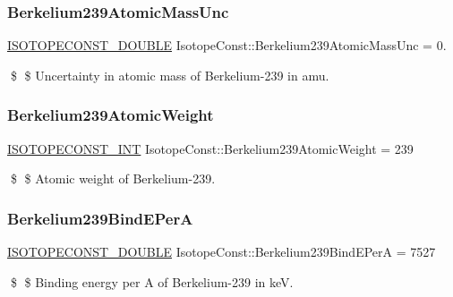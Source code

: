 \subsubsection{\texorpdfstring{Berkelium239\+Atomic\+Mass\+Unc}{Berkelium239AtomicMassUnc}}
{\footnotesize\ttfamily \mbox{\hyperlink{group___isotope_const-_macros_ga8f45a7272ce02c0b4c65c44636ed719a}{I\+S\+O\+T\+O\+P\+E\+C\+O\+N\+S\+T\+\_\+\+D\+O\+U\+B\+LE}} Isotope\+Const\+::\+Berkelium239\+Atomic\+Mass\+Unc = 0.}

\$ \$ Uncertainty in atomic mass of Berkelium-\/239 in amu. \mbox{\label{group___isotope_const-_berkelium-_bk239_ga7036cf9e2f9f7006b5616cdb0dd8f179}} 
\subsubsection{\texorpdfstring{Berkelium239\+Atomic\+Weight}{Berkelium239AtomicWeight}}
{\footnotesize\ttfamily \mbox{\hyperlink{group___isotope_const-_macros_ga5f18360b3e99483a35c32d789e62621c}{I\+S\+O\+T\+O\+P\+E\+C\+O\+N\+S\+T\+\_\+\+I\+NT}} Isotope\+Const\+::\+Berkelium239\+Atomic\+Weight = 239}

\$ \$ Atomic weight of Berkelium-\/239. \mbox{\label{group___isotope_const-_berkelium-_bk239_ga5bdf53fcfe676cc7fb09053768ad8421}} 
\subsubsection{\texorpdfstring{Berkelium239\+Bind\+E\+PerA}{Berkelium239BindEPerA}}
{\footnotesize\ttfamily \mbox{\hyperlink{group___isotope_const-_macros_ga8f45a7272ce02c0b4c65c44636ed719a}{I\+S\+O\+T\+O\+P\+E\+C\+O\+N\+S\+T\+\_\+\+D\+O\+U\+B\+LE}} Isotope\+Const\+::\+Berkelium239\+Bind\+E\+PerA = 7527}

\$ \$ Binding energy per A of Berkelium-\/239 in keV. \mbox{\label{group___isotope_const-_berkelium-_bk239_gab63154360603f635f882b9b3c71667a8}} 
